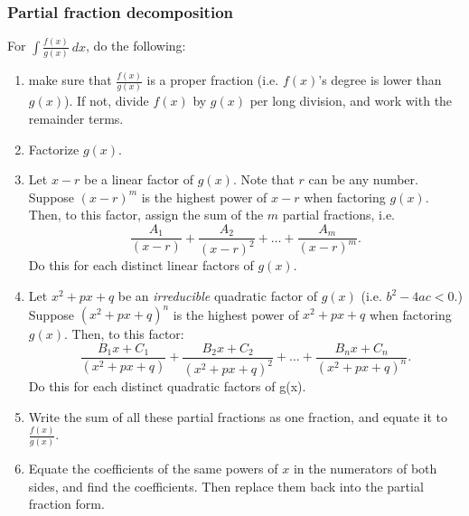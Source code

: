 \documentclass[main.tex]{subfiles}
\begin{document}
\begin{multicols}{2}
	\subsubsection*{Partial fraction decomposition}
	For \(\int \frac{f(x)}{g(x)} \ dx\), do the following:
	\begin{enumerate}
		\item make sure that \(\frac{f(x)}{g(x)}\) is a proper fraction (i.e. \(f(x)\)'s degree is lower than \(g(x)\)). If not, divide \(f(x)\) by \(g(x)\) per long division, and work with the remainder terms.
		\item Factorize \(g(x)\).
		\item Let \(x - r\) be a linear factor of \(g(x)\). Note that \(r\) can be any number. Suppose \((x - r)^m\) is the highest power of \(x - r\) when factoring \(g(x)\). Then, to this factor, assign the sum of the \(m\) partial fractions, i.e. 
		\[\frac{A_1}{(x - r)} + \frac{A_2}{(x - r)^2} + \dots + \frac{A_m}{(x - r)^m}.\] 
		Do this for each distinct linear factors of \(g(x)\).
		\item Let \(x^2 + px + q\) be an \emph{irreducible} quadratic factor of \(g(x)\) (i.e. \(b^2 - 4ac < 0\).) Suppose \((x^2 + px + q)^n\) is the highest power of \(x^2 + px + q\) when factoring \(g(x)\). Then, to this factor: 
		\[\frac{B_1x + C_1}{(x^2 + px + q)} + \frac{B_2x + C_2}{(x^2 + px + q)^2} + \dots + \frac{B_n x + C_n}{(x^2 + px + q)^n}.\]
		Do this for each distinct quadratic factors of g(x).
		\item Write the sum of all these partial fractions as one fraction, and equate it to \(\frac{f(x)}{g(x)}\).
		\item Equate the coefficients of the same powers of \(x\) in the numerators of both sides, and find the coefficients. Then replace them back into the partial fraction form.
	\end{enumerate}

\end{multicols}
\end{document}
